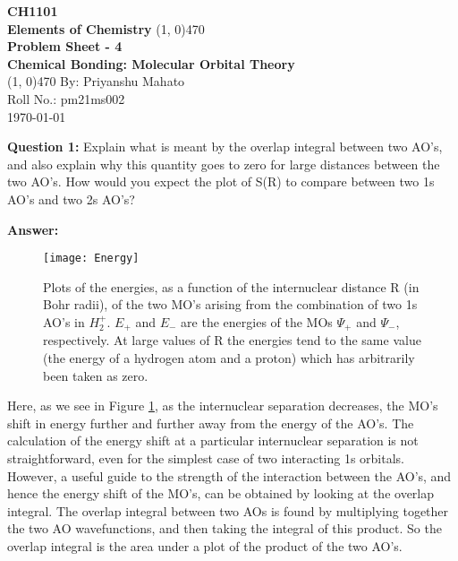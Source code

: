 \documentclass[12pt]{article}
\begin{document}
		\thispagestyle{empty}
	
	\begin{titlepage}
		\begin{center}
			\vspace{2cm}
			\huge\textbf{CH1101}\\
			\vspace{1cm}
			\large\textbf{Elements of Chemistry}
			\vfill
			\line(1, 0){470}\\[14pt]
			\huge\textbf{Problem Sheet - 4}\\[10pt]
			\Large\textbf{Chemical Bonding: Molecular Orbital Theory}\\[14pt]
			\line(1, 0){470}
			\vfill
			By: Priyanshu Mahato\\
			Roll No.: pm21ms002\\
			\today
		\end{center}
	\end{titlepage}
	
	\setcounter{page}{1}
	
	\textbf{Question 1: }Explain what is meant by the overlap integral between two AO’s, and also explain why this 
	quantity goes to zero for large distances between the two AO’s. How would you expect the plot of S(R) to compare between two 1s AO’s and two 2s AO’s?
	
	\textbf{Answer: }
	
	\begin{figure}[H]
		\centering
		\texttt{[image: Energy]}
		\caption{Plots of the energies, as a
			function of the internuclear
			distance R (in Bohr radii), of the
			two MO's arising from the
			combination of two 1s AO's in $H^{+}_{2}$. $E_{+}$ and $E_{-}$ are the energies of the
			MOs $\Psi_{+}$ and $\Psi_{-}$, respectively. At
			large values of R the energies tend
			to the same value (the energy of a
			hydrogen atom and a proton)
			which has arbitrarily been taken as zero.}
		\label{figure:ED}
	\end{figure}

	Here, as we see in Figure \ref{figure:ED}, as the internuclear separation decreases, the MO's shift in energy further and further away from the energy of the AO's. The calculation
	of the energy shift at a particular internuclear separation is not straightforward, even for the simplest case of two interacting 1s orbitals. However, a useful guide to the strength of the interaction between the AO's, and hence
	the energy shift of the MO's, can be obtained by looking at the overlap integral. The overlap integral between two AOs is found by multiplying together the two AO wavefunctions, and then taking the integral of this product.  So the overlap integral is the area under a plot of the product of the two AO's.
	
\end{document}

